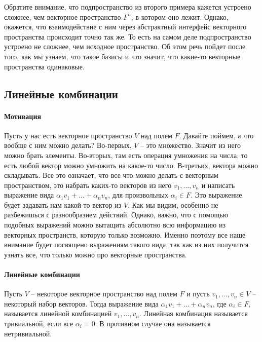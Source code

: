 Обратите внимание, что подпространство из второго примера кажется устроено сложнее, чем векторное пространство $F^n$, в котором оно лежит.
Однако, окажется, что взаимодействие с ним через абстрактный интерфейс векторного пространства происходит точно так же.
То есть на самом деле подпространство устроено не сложнее, чем исходное пространство.
Об этом речь пойдет после того, как мы узнаем, что такое базисы и что значит, что какие-то векторные пространства одинаковые.

\subsection{Линейные комбинации}

\paragraph{Мотивация}

Пусть у нас есть векторное пространство $V$ над полем $F$.
Давайте поймем, а что вообще с ним можно делать?
Во-первых, $V$ -- это множество.
Значит из него можно брать элементы.
Во-вторых, там есть операция умножения на числа, то есть любой вектор можно умножить на какое-то число.
В-третьих, вектора можно складывать.
Все это означает, что все что можно делать с векторным пространством, это набрать каких-то векторов из него $v_1,\ldots,v_n$ и написать выражение вида $\alpha_1 v_1 + \ldots + \alpha_n v_n$, для произвольных $\alpha_i\in F$.
Это выражение будет задавать нам какой-то вектор из $V$.
Как мы видим, особенно не разбежишься с разнообразием действий.
Однако, важно, что с помощью подобных выражений можно вытащить абсолютно всю информацию из векторных пространств, которую только возможно.
Именно поэтому все наше внимание будет посвящено выражениям такого вида, так как из них получится узнать все, что только можно про векторные пространства.

\paragraph{Линейные комбинации}

\begin{definition}
Пусть $V$ -- некоторое векторное пространство над полем $F$ и пусть $v_1,\ldots,v_n\in V$ -- некоторый набор векторов.
Тогда выражение вида $\alpha_1 v_1 +\ldots + \alpha_n v_n$, где $\alpha_i\in F$, называется линейной комбинацией $v_1,\ldots,v_n$.
Линейная комбинация называется тривиальной, если все $\alpha_i = 0$.
В противном случае она называется нетривиальной.
\end{definition}

